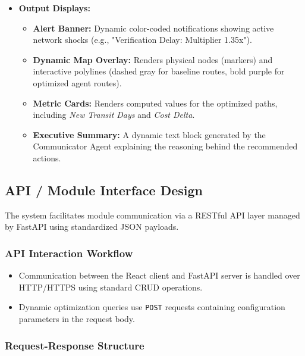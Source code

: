 \begin{itemize}
\begin{itemize}
        \item \textbf{Action Button:} A single high-contrast button labeled \texttt{Run Optimization} triggers the background agentic pipeline.
    \end{itemize}
    \item \textbf{Output Displays:}
    \begin{itemize}
        \item \textbf{Alert Banner:} Dynamic color-coded notifications showing active network shocks (e.g., "Verification Delay: Multiplier 1.35x").
        \item \textbf{Dynamic Map Overlay:} Renders physical nodes (markers) and interactive polylines (dashed gray for baseline routes, bold purple for optimized agent routes).
        \item \textbf{Metric Cards:} Renders computed values for the optimized paths, including \textit{New Transit Days} and \textit{Cost Delta}.
        \item \textbf{Executive Summary:} A dynamic text block generated by the Communicator Agent explaining the reasoning behind the recommended actions.
    \end{itemize}
\end{itemize}

\subsection[API / Module Interface Design]{API / Module Interface Design}

The system facilitates module communication via a RESTful API layer managed by FastAPI using standardized JSON payloads.

\subsubsection{API Interaction Workflow}
\begin{itemize}
    \item Communication between the React client and FastAPI server is handled over HTTP/HTTPS using standard CRUD operations.
    \item Dynamic optimization queries use \texttt{POST} requests containing configuration parameters in the request body.
\end{itemize}

\subsubsection{Request-Response Structure}

